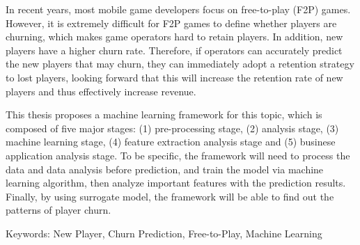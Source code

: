 
In recent years, most mobile game developers focus on free-to-play (F2P) games. However, it is extremely difficult for F2P games to define whether players are churning, which makes game operators hard to retain players. In addition, new players have a higher churn rate. Therefore, if operators can accurately predict the new players that may churn, they can immediately adopt a retention strategy to lost players, looking forward that this will increase the retention rate of new players and thus effectively increase revenue.

This thesis proposes a machine learning framework for this topic, which is composed of five major stages: (1) pre-processing stage, (2) analysis stage, (3) machine learning stage, (4) feature extraction analysis stage and (5) businese application analysis stage. To be specific, the framework will need to process the data and data analysis before prediction, and train the model via machine learning algorithm, then analyze important features with the prediction results. Finally, by using surrogate model, the framework will be able to find out the patterns of player churn.

Keywords: New Player, Churn Prediction, Free-to-Play, Machine Learning